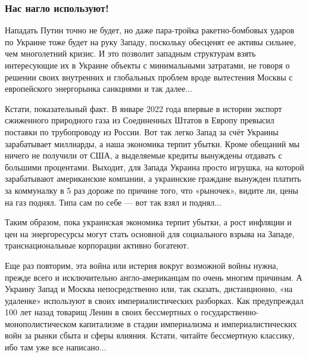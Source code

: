  
 
 
 
 

\subsubsection{Нас нагло используют!}
\label{sec:17_02_2022.stz.news.ua.fraza.1.kak_zapadnyje_partnery_opuskajut_ukrainu.5.nas_naglo_ispolzujut}

Нападать Путин точно не будет, но даже пара-тройка ракетно-бомбовых ударов по
Украине тоже будет на руку Западу, поскольку обесценят ее активы сильнее, чем
многолетний кризис. И это позволит западным структурам взять интересующие их в
Украине объекты с минимальными затратами, не говоря о решении своих внутренних
и глобальных проблем вроде вытестения Москвы с европейского энергорынка
санкциями и так далее...

Кстати, показательный факт. В январе 2022 года впервые в истории экспорт
сжиженного природного газа из Соединенных Штатов в Европу превысил поставки по
трубопроводу из России. Вот так легко Запад за счёт Украины зарабатывает
миллиарды, а наша экономика терпит убытки. Кроме обещаний мы ничего не получили
от США, а выделяемые кредиты вынуждены отдавать с большими процентами. Выходит,
для Запада Украина просто игрушка, на которой зарабатывают американские
компании, а украинские граждане вынужден платить за коммуналку в 5 раз дороже
по причине того, что «рыночек», видите ли, цены на газ поднял. Типа сам по себе
— вот так взял и поднял...

Таким образом, пока украинская экономика терпит убытки, а рост инфляции и цен
на энергоресурсы могут стать основной для социального взрыва на Западе,
транснациональные корпорации активно богатеют.

Еще раз повторим, эта война или истерия вокруг возможной войны нужна, прежде
всего и исключительно англо-американцам по очень многим причинам. А Украину
Запад и Москва непосредственно или, так сказать, дистанционно, «на удаленке»
используют в своих империалистических разборках. Как предупреждал 100 лет назад
товарищ Ленин в своих бессмертных о государственно-монополистическом
капитализме в стадии империализма и империалистических войн за рынки сбыта и
сферы влияния. Кстати, читайте бессмертную классику, ибо там уже все
написано...

